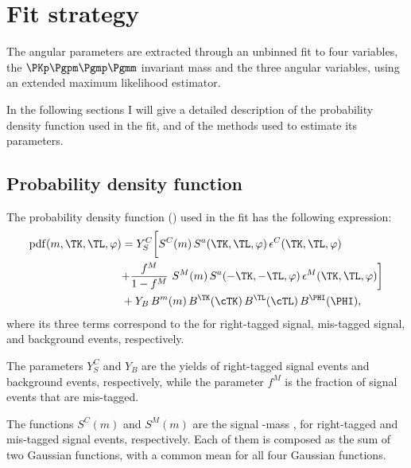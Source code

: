 \chapter{Fit strategy} \label{sec:fit}

The angular parameters are extracted through an unbinned fit to four variables, the $\PKp\Pgpm\Pgmp\Pgmm$ invariant mass and the three angular variables, using an extended maximum likelihood estimator.

In the following sections I will give a detailed description of the probability density function used in the fit, and of the methods used to estimate its parameters.

\section{Probability density function}
\label{sec:TotalPDF}

The probability density function (\pdf) used in the fit has the following expression:
\begin{equation} \label{eq:angALL}
  \begin{split}
    \mathrm{pdf}(m,\TK,\TL,\varphi) & = Y^{C}_{S} \biggl[ S^{C}(m)  \, S^a(\TK,\TL,\varphi) \, \epsilon^{C}(\TK,\TL,\varphi) \biggr. \\
      & \biggl. + \frac{f^{M}}{1-f^{M}}~S^{M}(m) \, S^a(-\TK,-\TL,\varphi) \, \epsilon^{M}(\TK,\TL,\varphi) \biggr] \\
    & + Y_{B}\,B^m(m) \, B^{\TK}(\cTK) \, B^{\TL}(\cTL) \, B^{\PHI}(\PHI), \\
  \end{split}
\end{equation}
where its three terms correspond to the \pdfs for right-tagged signal, mis-tagged signal, and background events, respectively.

The parameters $Y^{C}_{S}$ and $Y_{B}$ are the yields of right-tagged signal events and background events, respectively, while the parameter $f^{M}$ is the fraction of signal events that are mis-tagged.

The functions $S^{C}(m)$ and $S^{M}(m)$ are the signal \PBz-mass \pdfs, for right-tagged and mis-tagged signal events, respectively.
Each of them is composed as the sum of two Gaussian functions, with a common mean for all four Gaussian functions.


